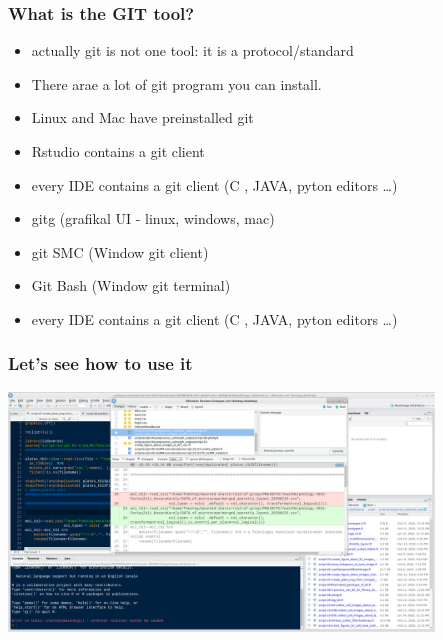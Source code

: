\documentclass[aspectratio=169]{beamer}
\begin{document}
\begin{frame}
\frametitle<presentation>{What is the GIT tool?}

	\begin{itemize}
  		\item actually git is not one tool: it is a protocol/standard
		\item There arae a lot of git program you can install.
	\end{itemize}
\pause
	\begin{itemize}
  		\item Linux and Mac have preinstalled git
		\item Rstudio contains a git client
		\item every IDE contains a git client (C , JAVA, pyton editors \ldots)
	\end{itemize}
\pause
	\begin{itemize}
  		\item gitg  (grafikal UI - linux, windows, mac)
		\item git SMC (Window git client)
		\item Git Bash (Window git terminal)
		\item every IDE contains a git client (C , JAVA, pyton editors \ldots)
	\end{itemize}


\end{frame}





\begin{frame}
\frametitle<presentation>{Let's see how to use it}
\includegraphics[height=180pt]{pictures/Screenshot_2020-02-26_08-48-52-rstudio-commit-window.png}

\end{frame}
\end{document}
